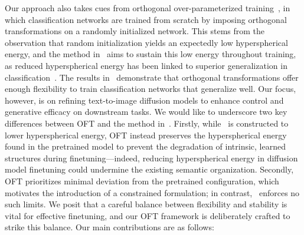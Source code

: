 Our approach also takes cues from orthogonal over-parameterized training~\cite{liu2021orthogonal}, in which classification networks are trained from scratch by imposing orthogonal transformations on a randomly initialized network. This stems from the observation that random initialization yields an expectedly low hyperspherical energy, and the method in~\cite{liu2021orthogonal} aims to sustain this low energy throughout training, as reduced hyperspherical energy has been linked to superior generalization in classification~\cite{liu2018learning,lin2020regularizing}. The results in~\cite{liu2021orthogonal} demonstrate that orthogonal transformations offer enough flexibility to train classification networks that generalize well. Our focus, however, is on refining text-to-image diffusion models to enhance control and generative efficacy on downstream tasks. We would like to underscore two key differences between OFT and the method in~\cite{liu2021orthogonal}. Firstly, while~\cite{liu2021orthogonal} is constructed to lower hyperspherical energy, OFT instead preserves the hyperspherical energy found in the pretrained model to prevent the degradation of intrinsic, learned structures during finetuning—indeed, reducing hyperspherical energy in diffusion model finetuning could undermine the existing semantic organization. Secondly, OFT prioritizes minimal deviation from the pretrained configuration, which motivates the introduction of a constrained formulation; in contrast,~\cite{liu2021orthogonal} enforces no such limits. We posit that a careful balance between flexibility and stability is vital for effective finetuning, and our OFT framework is deliberately crafted to strike this balance. Our main contributions are as follows:

